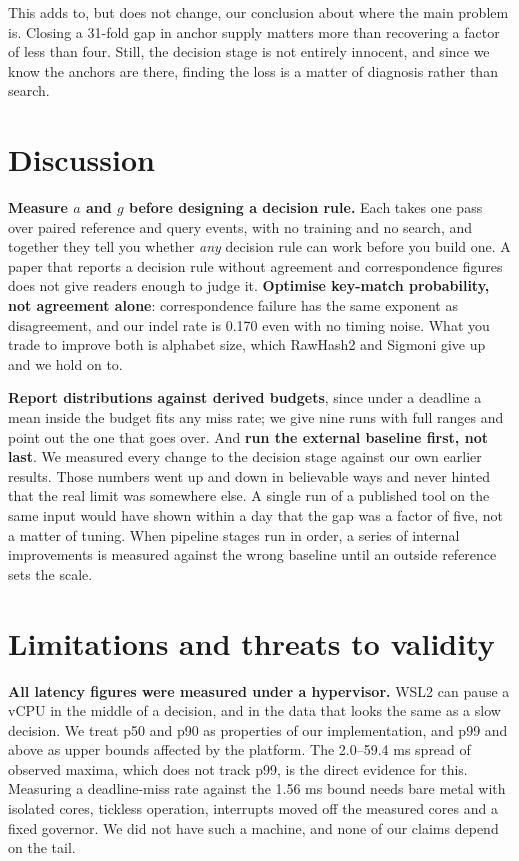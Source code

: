 \documentclass[conference]{IEEEtran}
\begin{document}
This adds to, but does not change, our conclusion about where the main problem is. Closing a
31-fold gap in anchor supply matters more than recovering a factor of less than four. Still, the
decision stage is not entirely innocent, and since we know the anchors are there, finding the
loss is a matter of diagnosis rather than search.

\section{Discussion}
\textbf{Measure $a$ and $g$ before designing a decision rule.} Each takes one pass over paired
reference and query events, with no training and no search, and together they tell you whether
\emph{any} decision rule can work before you build one. A paper that reports a decision rule
without agreement and correspondence figures does not give readers enough to judge it.
\textbf{Optimise key-match probability, not agreement alone}: correspondence failure has the same
exponent as disagreement, and our indel rate is 0.170 even with no timing noise. What you trade
to improve both is alphabet size, which RawHash2 and Sigmoni give up and we hold on to.

\textbf{Report distributions against derived budgets}, since under a deadline a mean inside the
budget fits any miss rate; we give nine runs with full ranges and point out the one that goes
over. And \textbf{run the external baseline first, not last}. We measured every change to the
decision stage against our own earlier results. Those numbers went up and down in believable
ways and never hinted that the real limit was somewhere else. A single run of a published tool on
the same input would have shown within a day that the gap was a factor of five, not a matter of
tuning. When pipeline stages run in order, a series of internal improvements is measured against
the wrong baseline until an outside reference sets the scale.

\section{Limitations and threats to validity}
\label{sec:limits}

\textbf{All latency figures were measured under a hypervisor.} WSL2 can pause a vCPU in the
middle of a decision, and in the data that looks the same as a slow decision. We treat p50 and
p90 as properties of our implementation, and p99 and above as upper bounds affected by the
platform. The 2.0--59.4 ms spread of observed maxima, which does not track p99, is the direct
evidence for this. Measuring a deadline-miss rate against the 1.56 ms bound needs bare metal
with isolated cores, tickless operation, interrupts moved off the measured cores and a fixed
governor. We did not have such a machine, and none of our claims depend on the tail.
\end{document}
